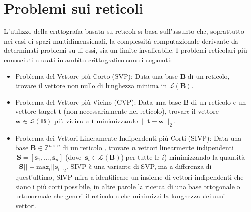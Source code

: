 \section{Problemi sui reticoli}
\label{sec:problemi}
L’utilizzo della crittografia basata su reticoli si basa sull’assunto che, soprattutto nei 
casi di spazi multidimensionali, la complessità computazionale derivante da determinati 
problemi su di essi, sia un limite invalicabile. I problemi reticolari 
più conosciuti e usati in ambito crittografico sono i seguenti:
\begin{itemize}
    \item Problema del Vettore più Corto (SVP): Data una base $\mathbf{B}$ di un reticolo, 
    trovare il vettore non nullo di lunghezza minima in $\mathcal{L}(\mathbf{B})$.
    \item Problema del Vettore più Vicino (CVP): Data una base $\mathbf{B}$ di un reticolo e un 
    vettore target $\mathbf{t}$ (non necessariamente nel reticolo), trovare il vettore 
    $\mathbf{w} \in \mathcal{L}(\mathbf{B})$ più vicino a $\mathbf{t}$ minimizzando 
    $\|\mathbf{t}-\mathbf{w}\|_2$.
    \item Problema dei Vettori Lineramente Indipendenti più Corti (SIVP): 
    Data una base $\mathbf{B} \in \mathbb{Z}^{n\times n}$ di un reticolo , 
    trovare $n$ vettori linearmente indipendenti 
    $\ {\mathbf{S} = [\mathbf{s}_1, \dots, \mathbf{s}_n]}$ 
    \mbox{(dove  $\mathbf{s}_i \in \mathcal{L}(\mathbf{B})$)}
    per tutte le $i$) minimizzando la quantità 
    ${||\mathbf{S}|| = \text{max}_i||\mathbf{s}_i||_2}$. 
    SIVP è una variante di SVP, ma a differenza di quest'ultimo, SIVP mira a identificare 
    un insieme di vettori indipendenti che siano i più corti possibile, in altre parole 
    la ricerca di una base ortogonale o ortonormale che generi il reticolo e che minimizzi
     la lunghezza dei suoi vettori.
    \end{itemize}

